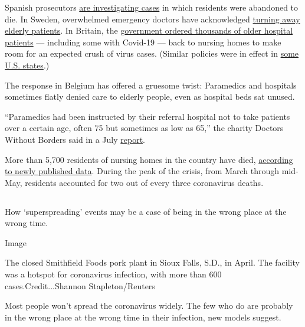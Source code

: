 Spanish prosecutors
\href{https://www.nytimes.com/2020/03/25/world/europe/Spain-coronavirus-nursing-homes.html}{are
investigating cases} in which residents were abandoned to die. In
Sweden, overwhelmed emergency doctors have acknowledged
\href{https://www.dn.se/nyheter/sverige/overlakare-logn-att-patienter-inte-prioriterats-bort/}{turning
away elderly patients}. In Britain, the
\href{https://www.independent.co.uk/news/health/coronavirus-care-homes-nhs-hospital-discharges-deaths-a9544671.html}{government
ordered thousands of older hospital patients} --- including some with
Covid-19 --- back to nursing homes to make room for an expected crush of
virus cases. (Similar policies were in effect in
\href{https://www.nytimes.com/2020/04/24/us/nursing-homes-coronavirus.html}{some
U.S. states}.)

The response in Belgium has offered a gruesome twist: Paramedics and
hospitals sometimes flatly denied care to elderly people, even as
hospital beds sat unused.

``Paramedics had been instructed by their referral hospital not to take
patients over a certain age, often 75 but sometimes as low as 65,'' the
charity Doctors Without Borders said in a July
\href{https://www.msf.org/sites/msf.org/files/2020-07/Left\%20behind\%20-\%20MSF\%20care\%20homes\%20in\%20Belgium\%20report.pdf}{report}.

More than 5,700 residents of nursing homes in the country have died,
\href{https://www.medrxiv.org/content/10.1101/2020.06.20.20136234v1.full.pdf}{according
to newly published data}. During the peak of the crisis, from March
through mid-May, residents accounted for two out of every three
coronavirus deaths.

\hypertarget{section-7}{%
\subsection{}\label{section-7}}

How `superspreading' events may be a case of being in the wrong place at
the wrong time.

Image

The closed Smithfield Foods pork plant in Sioux Falls, S.D., in April.
The facility was a hotspot for coronavirus infection, with more than 600
cases.Credit...Shannon Stapleton/Reuters

Most people won't spread the coronavirus widely. The few who do are
probably in the wrong place at the wrong time in their infection, new
models suggest.

